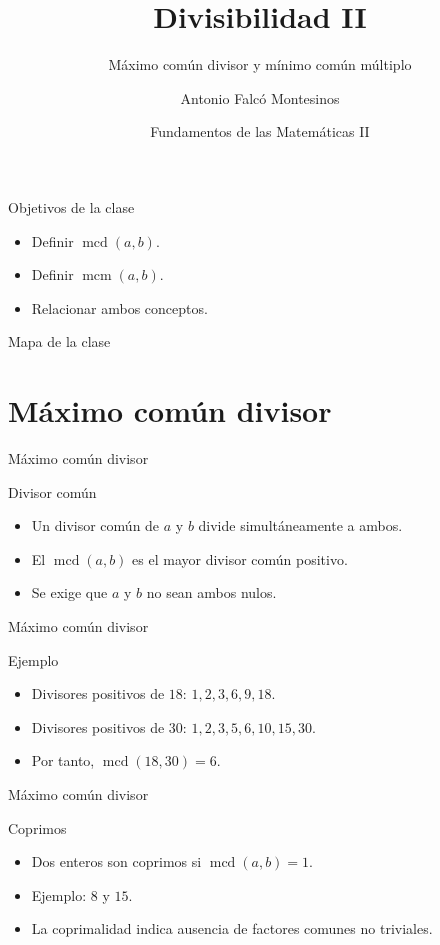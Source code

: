 \documentclass[aspectratio=169,11pt]{beamer}
\title[FdM II -- Clase 04]{Divisibilidad II}
\subtitle{Máximo común divisor y mínimo común múltiplo}
\author{Antonio Falcó Montesinos}
\institute{Universidad CEU Cardenal Herrera}
\date{Fundamentos de las Matemáticas II}
\newcommand{\mcd}{\operatorname{mcd}}
\newcommand{\mcm}{\operatorname{mcm}}
\begin{document}
\begin{frame}
  \titlepage
\end{frame}

\begin{frame}{Objetivos de la clase}
\begin{itemize}
  \item Definir \(\mcd(a,b)\).
  \item Definir \(\mcm(a,b)\).
  \item Relacionar ambos conceptos.
\end{itemize}
\end{frame}

\begin{frame}{Mapa de la clase}
\tableofcontents
\end{frame}

\section{Máximo común divisor}

\begin{frame}{Máximo común divisor}
\begin{block}{Divisor común}
\begin{itemize}
  \item Un divisor común de \(a\) y \(b\) divide simultáneamente a ambos.
  \item El \(\mcd(a,b)\) es el mayor divisor común positivo.
  \item Se exige que \(a\) y \(b\) no sean ambos nulos.
\end{itemize}
\end{block}
\end{frame}

\begin{frame}{Máximo común divisor}
\begin{block}{Ejemplo}
\begin{itemize}
  \item Divisores positivos de \(18\): \(1,2,3,6,9,18\).
  \item Divisores positivos de \(30\): \(1,2,3,5,6,10,15,30\).
  \item Por tanto, \(\mcd(18,30)=6\).
\end{itemize}
\end{block}
\end{frame}

\begin{frame}{Máximo común divisor}
\begin{block}{Coprimos}
\begin{itemize}
  \item Dos enteros son coprimos si \(\mcd(a,b)=1\).
  \item Ejemplo: \(8\) y \(15\).
  \item La coprimalidad indica ausencia de factores comunes no triviales.
\end{itemize}
\end{block}
\end{frame}
\end{document}
